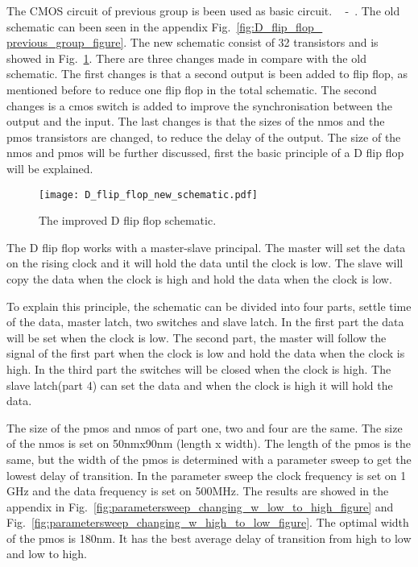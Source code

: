 The CMOS circuit of previous group is been used as basic circuit. ~\cite{coursebook} -~\cite{powerdac}. The old schematic can been seen in the appendix Fig.~\ref{fig:D_flip_flop_ previous_group_figure}. The new schematic consist of 32 transistors and is showed in Fig.~\ref{fig:D_flip_flop_schematic_figure}. There are three changes made in compare with the old schematic. The first changes is that a second output is been added to flip flop, as mentioned before to reduce one flip flop in the total schematic. The second changes is a cmos switch is added to improve the synchronisation between the output and the input. The last changes is that the sizes of the nmos and the pmos transistors are changed, to reduce the delay of the output. The size of the nmos and pmos will be further discussed, first the basic principle of a D flip flop will be explained. 

\begin{figure}[h]
\texttt{[image: D\_flip\_flop\_new\_schematic.pdf]}
\caption{The improved D flip flop schematic.}
\label{fig:D_flip_flop_schematic_figure}
\end{figure}

The D flip flop works with a master-slave principal. The master will set the data on the rising clock and it will hold the data until the clock is low. The slave will copy the data when the clock is high and hold the data when the clock is low.

To explain this principle, the schematic can be divided into four parts, settle time of the data, master latch, two switches and slave latch. In the first part the data will be set when the clock is low. The second part, the master will follow the signal of the first part when the clock is low and hold the data when the clock is high. In the third part the switches will be closed when the clock is high. The slave latch(part 4) can set the data and when the clock is high it will hold the data.
 
The size of the pmos and nmos of part one, two and four are the same. The size of the nmos is set on 50nmx90nm (length x width). The length of the pmos is the same, but the width of the pmos is determined with a parameter sweep to get the lowest delay of transition. In the parameter sweep the clock frequency is set on 1 GHz and the data frequency is set on 500MHz. The results are showed in the appendix in Fig.~\ref{fig:parametersweep_changing_w_low_to_high_figure} and Fig.~\ref{fig:parametersweep_changing_w_high_to_low_figure}. The optimal width of the pmos is 180nm. It has the best average delay of transition from high to low and low to high.

